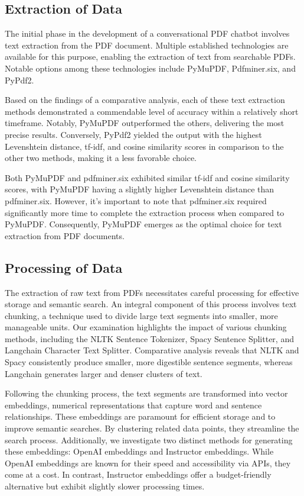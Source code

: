 \documentclass[conference]{IEEEtran}
\begin{document}
\subsection{Extraction of Data}

The initial phase in the development of a conversational PDF chatbot involves text extraction from the PDF document. Multiple established technologies are available for this purpose, enabling the extraction of text from searchable PDFs. Notable options among these technologies include PyMuPDF, Pdfminer.six, and PyPdf2.

Based on the findings of a comparative analysis, each of these text extraction methods demonstrated a commendable level of accuracy within a relatively short timeframe. Notably, PyMuPDF outperformed the others, delivering the most precise results. Conversely, PyPdf2 yielded the output with the highest Levenshtein distance, tf-idf, and cosine similarity scores in comparison to the other two methods, making it a less favorable choice.

Both PyMuPDF and pdfminer.six exhibited similar tf-idf and cosine similarity scores, with PyMuPDF having a slightly higher Levenshtein distance than pdfminer.six. However, it's important to note that pdfminer.six required significantly more time to complete the extraction process when compared to PyMuPDF. Consequently, PyMuPDF emerges as the optimal choice for text extraction from PDF documents.

\subsection{Processing of Data}

The extraction of raw text from PDFs necessitates careful processing for effective storage and semantic search. An integral component of this process involves text chunking, a technique used to divide large text segments into smaller, more manageable units. Our examination highlights the impact of various chunking methods, including the NLTK Sentence Tokenizer, Spacy Sentence Splitter, and Langchain Character Text Splitter. Comparative analysis reveals that NLTK and Spacy consistently produce smaller, more digestible sentence segments, whereas Langchain generates larger and denser clusters of text.

Following the chunking process, the text segments are transformed into vector embeddings, numerical representations that capture word and sentence relationships. These embeddings are paramount for efficient storage and to improve semantic searches. By clustering related data points, they streamline the search process. Additionally, we investigate two distinct methods for generating these embeddings: OpenAI embeddings and Instructor embeddings. While OpenAI embeddings are known for their speed and accessibility via APIs, they come at a cost. In contrast, Instructor embeddings offer a budget-friendly alternative but exhibit slightly slower processing times.
\end{document}
